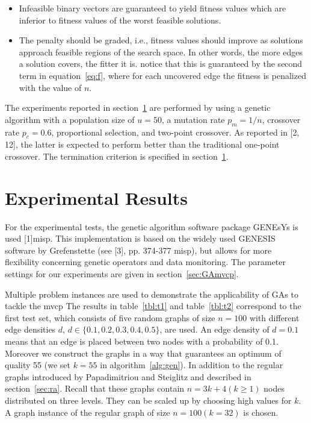 \documentclass[12pt]{article}
\begin{document}
\begin{itemize}
\vspace{-3mm}

\item Infeasible binary vectors are guaranteed to yield fitness
values which are inferior to fitness values of
the worst feasible solutions.

\item The penalty should be graded, i.e., fitness values
should improve as solutions approach feasible regions
of the search space. In other words, the more edges a solution
covers, the fitter it is. notice that this is guaranteed by the
second term in equation~\ref{eq:f}, where for each uncovered edge
the fitness is penalized with the value of $n$.
\end{itemize}

The experiments reported in section~\ref{sec:er} are performed
by using a genetic algorithm with a population size of
$u = 50$, a mutation rate $p_m = 1/n$, crossover rate
$p_c = 0.6$, proportional selection, and two-point crossover.
As reported in [2, 12], the latter is expected to perform
better than the traditional one-point crossover.
The termination criterion is specified in section~\ref{sec:er}.


\section{Experimental Results}
\label{sec:er}
For the experimental tests,
the genetic algorithm software package GENEsYs is used [1]misp.
This implementation is based on the widely used GENESIS software by Grefenstette
(see [3], pp. 374-377 misp), but allows for more 
flexibility concerning genetic operators and data monitoring.
The parameter settings for our experiments are
given in section~\ref{sec:GAmvcp}.


Multiple problem instances are used to demonstrate the applicability of GAs to tackle the mvcp
The results in table~\ref{tbl:t1}
and table~\ref{tbl:t2} correspond to the first test set, which consists of
five random graphs of size $n = 100$ with different
edge densities $d$, $d \in \{0.1, 0.2, 0.3, 0.4, 0.5\}$, are used.
An edge density of $d = 0.1$ means that an edge is placed between two
nodes with a probability of 0.1.
Moreover we construct the graphs in a way that guarantees an optimum of quality 55
(we set $k = 55$ in algorithm~\ref{alg:gen}).
In addition to the regular graphs introduced by
Papadimitriou and Steiglitz and described in section~\ref{sec:ra}.
Recall that these graphs contain $n=3k+4 (k \geq 1)$ nodes distributed on three levels.
They can be scaled up by choosing high values for $k$.
A graph instance of the regular graph of size $n = 100 (k=32)$ is chosen.
\end{document}
